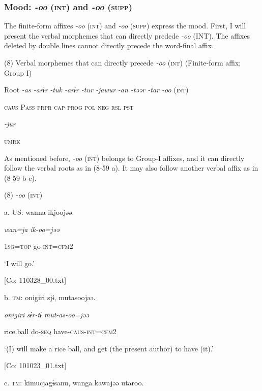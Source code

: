 \subsubsection{Mood: \textit{{}-oo} (\textsc{int}) and \textit{{}-oo} (\textsc{supp})}

The finite-form affixes \textit{-oo} (\textsc{int}) and \textit{{}-oo} (\textsc{supp}) express the mood. First, I will present the verbal morphemes that can directly predede \textit{{}-oo} (INT). The affixes deleted by double lines cannot directly precede the word-final affix.

(8)  Verbal morphemes that can directly precede \textit{-oo} (\textsc{int}) (Finite-form affix; Group I)

  Root  \textit{{}-as  {}-arɨr} %
\textit{{}-tuk  {}-arɨr  {}-tur  {}-jawur} %
\textit{{}-an  {}-təər  {}-tar  {}-oo} (\textsc{int})

    \textsc{caus}  P\textsc{ass}  \textsc{prpr}  \textsc{cap}  \textsc{prog}  \textsc{pol}  \textsc{neg}  \textsc{rsl}  \textsc{pst}

          \textit{{}-jur} 

          \textsc{umrk}

As mentioned before, \textit{{}-oo} (\textsc{int}) belongs to Group-I affixes, and it can directly follow the verbal roots as in (8-59 a). It may also follow another verbal affix as in (8-59 b-c).

(8)  \textit{{}-oo} (\textsc{int})

  a.  US:  wanna  ikjoojəə.

      \textit{wan=ja}  \textit{ik-oo=jəə}

      1\textsc{sg}=\textsc{top}  go-\textsc{int}=\textsc{cfm}2

      ‘I will go.’

      [Co: 110328\_00.txt]

  b.  \textsc{tm}:  {\textbar}onigiri{\textbar}  sjɨ,  mutasoojəə.

      \textit{onigiri}  \textit{sɨr-tɨ}  \textit{mut-as-oo=jəə}

      rice.ball  do-\textsc{seq}  have-\textsc{caus}-\textsc{int}=\textsc{cfm}2

      ‘(I) will make a rice ball, and get (the present author) to have (it).’

      [Co: 101023\_01.txt]

  c.  \textsc{tm}:  kimucjagɨsanu,  wanga  kawajəə  utaroo.


